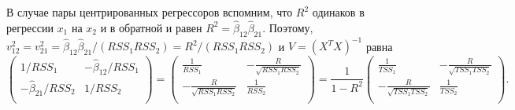 \documentclass[12pt]{article}
\newcommand{\hb}{\hat{\beta}}
\begin{document}
В случае пары центрированных регрессоров вспомним, что $R^2$ одинаков в регрессии $x_1$ на $x_2$ и в обратной и равен $R^2 = \hb_{12} \hb_{21}$.
Поэтому, $v_{12}^2 = v_{21}^2 = \hb_{12}\hb_{21} / (RSS_1 RSS_2) = R^2 / (RSS_1 RSS_2)$ и $V = (X^TX)^{-1}$ равна
\[
\begin{pmatrix}
    1/RSS_1 & -{\hb_{12}}/{RSS_1} \\
    - {\hb_{21}}/{RSS_2} & 1/RSS_2 \\
\end{pmatrix}  = 
\begin{pmatrix}
    \frac{1}{RSS_1} & -\frac{R}{\sqrt{RSS_1 RSS_2}} \\
    -\frac{R}{\sqrt{RSS_1 RSS_2}} & \frac{1}{RSS_2} \\
\end{pmatrix} = 
\frac{1}{1 - R^2}
\begin{pmatrix}
    \frac{1}{TSS_1} & -\frac{R}{\sqrt{TSS_1 TSS_2}} \\
    -\frac{R}{\sqrt{TSS_1 TSS_2}} & \frac{1}{TSS_2} \\
\end{pmatrix}. 
\]
\end{document}
